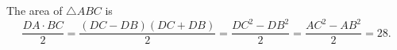 The area of $\triangle{ABC}$ is \[\frac{DA\cdot BC}{2}=\frac{\left(DC-DB\right)\left(DC+DB\right)}{2}=\frac{DC^2-DB^2}{2}=\frac{AC^2-AB^2}{2}=\boxed{28}.\]